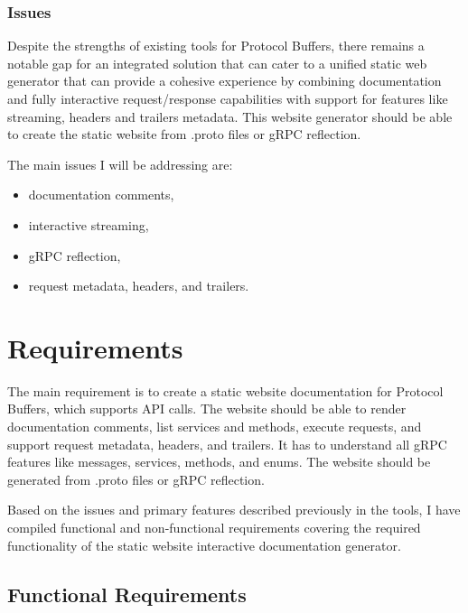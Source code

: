 \subsubsection{Issues}
Despite the strengths of existing tools for Protocol Buffers, there remains a notable gap for an integrated solution that can cater to a unified static web generator that can provide a cohesive experience by combining documentation and fully interactive request/response capabilities with support for features like streaming, headers and trailers metadata.
This website generator should be able to create the static website from .proto files or gRPC reflection.

The main issues I will be addressing are:
\begin{itemize}
    \item documentation comments,
    \item interactive streaming,
    \item gRPC reflection,
    \item request metadata, headers, and trailers.
\end{itemize}


\section{Requirements}
The main requirement is to create a static website documentation for Protocol Buffers, which supports API calls.
The website should be able to render documentation comments, list services and methods, execute requests, and support request metadata, headers, and trailers.
It has to understand all gRPC features like messages, services, methods, and enums.
The website should be generated from .proto files or gRPC reflection.

Based on the issues and primary features described previously in the tools, I have compiled functional and non-functional requirements covering the required functionality of the static website interactive documentation generator.

\subsection{Functional Requirements}
\newcommand{\functional}[1]{%
    \stepcounter{fcounter}%
    \subsubsection{F\arabic{fcounter} -- #1}%
}

